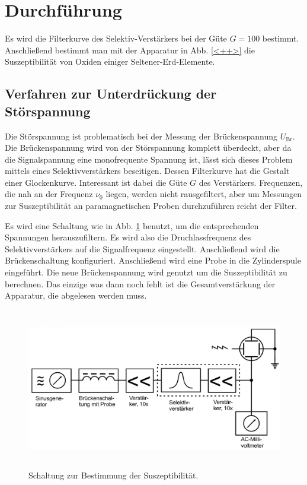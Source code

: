 \section{Durchführung}
\label{sec:Durchführung}

Es wird die Filterkurve des Selektiv-Verstärkers bei der Güte 
$G=\num{100}$ bestimmt. 
Anschließend bestimmt man mit der Apparatur in Abb. \ref{<++>} die 
Suszeptibilität von Oxiden einiger Seltener-Erd-Elemente. 


\subsection{Verfahren zur Unterdrückung der Störspannung}
Die Störspannung ist problematisch bei der Messung der Brückenspannung $U_\text{Br}$. 
Die Brückenspannung wird von der Störspannung komplett überdeckt, aber da die Signalspannung 
eine monofrequente Spannung ist, lässt sich dieses Problem mittels eines 
Selektivverstärkers beseitigen. Dessen Filterkurve hat die Gestalt einer Glockenkurve. 
Interessant ist dabei die Güte $G$ des Verstärkers. 
Frequenzen, die nah an der Frequenz $\nu_0$ liegen, werden nicht rausgefiltert, aber um 
Messungen zur Suszeptibilität an paramagnetischen Proben durchzuführen reicht der Filter. 

Es wird eine Schaltung wie in Abb. \ref{abb:schaltbild} benutzt, um die 
entsprechenden Spannungen herauszufiltern. 
Es wird also die Druchlassfrequenz des Selektivverstärkers auf die Signalfrequenz 
eingestellt. Anschließend wird die Brückenschaltung konfiguriert. Anschließend wird eine 
Probe in die Zylinderspule eingeführt. Die neue Brückenspannung wird genutzt um die 
Suszeptibilität zu berechnen. Das einzige was dann noch fehlt ist die Gesamtverstärkung 
der Apparatur, die abgelesen werden muss. 

\begin{figure}
    \centering
    \includegraphics[width=15cm, height=7cm]{build/schaltbild.png}
    \caption{Schaltung zur Bestimmung der Suszeptibilität. \cite{V606}}
    \label{abb:schaltbild}
\end{figure}


